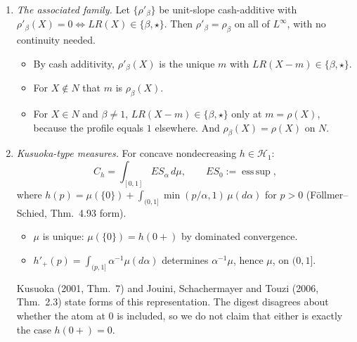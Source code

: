 \begin{proposition}[Uniqueness]
\begin{enumerate}
  \begin{itemize}
  \item If $r(p)\neq1$: $g(p)=\dfrac{\varphi_B(t)-1}{t\,(r(p)-\varphi_B(t))}$ and $h=r\,g$. The denominator is nonzero, because $\varphi_B=r$ would force $r=1$.
  \item If $r(p)=1$: $g(p)=\dfrac{h(q_0)-L\,g(q_0)}{L-1}$, where $L=LR_0(\mathbf 1_B+\mathbf 1_D)$ with $D$ nested and $r(q_0)\neq1$. Here $L\ne1$, since otherwise $h(q_0)=g(q_0)$.
  \end{itemize}
  Uniqueness also holds among signed pairs with $C_{g'}>0$ on $\mathcal X$:
  \begin{itemize}
  \item by the Half-line Lemma, $C_{h'}=\rho$ and $C_{g'}=\Pi$ off $N_0$;
  \item $N_0$ is fixed by $LR_0$ and has dense complement, by the Sweep Lemma since $h\ne g$;
  \item by continuity, $C_{h'}=\bar\rho$ and $C_{g'}=\bar\Pi$ on $\mathcal X$.
  \end{itemize}
  For the actuarial pair $h=\mathrm{id}$ one gets $g(p)=p/LR_0(\mathbf 1_B)$. In general $g(p)=h(p)/LR_0(\mathbf 1_B)$, which presupposes knowledge of $h$.
\item \emph{The associated family.} Let $\{\rho'_\beta\}$ be unit-slope cash-additive with $\rho'_\beta(X)=0\iff LR(X)\in\{\beta,\star\}$. Then $\rho'_\beta=\rho_\beta$ on all of $L^\infty$, with no continuity needed.
  \begin{itemize}
  \item By cash additivity, $\rho'_\beta(X)$ is the unique $m$ with $LR(X-m)\in\{\beta,\star\}$.
  \item For $X\notin N$ that $m$ is $\rho_\beta(X)$.
  \item For $X\in N$ and $\beta\ne1$, $LR(X-m)\in\{\beta,\star\}$ only at $m=\rho(X)$, because the profile equals $1$ elsewhere. And $\rho_\beta(X)=\rho(X)$ on $N$.
  \end{itemize}
\item \emph{Kusuoka-type measures.} For concave nondecreasing $h\in\mathcal H_1$:
  \[
  C_h=\int_{[0,1]}ES_\alpha\,d\mu,\qquad ES_0:=\operatorname{ess\,sup},
  \]
  where $h(p)=\mu(\{0\})+\int_{(0,1]}\min(p/\alpha,1)\,\mu(d\alpha)$ for $p>0$ (F\"ollmer--Schied, Thm.~4.93 form).
  \begin{itemize}
  \item $\mu$ is unique: $\mu(\{0\})=h(0+)$ by dominated convergence.
  \item $h'_+(p)=\int_{(p,1]}\alpha^{-1}\mu(d\alpha)$ determines $\alpha^{-1}\mu$, hence $\mu$, on $(0,1]$.
  \end{itemize}
  Kusuoka (2001, Thm.~7) and Jouini, Schachermayer and Touzi (2006, Thm.~2.3) state forms of this representation. The digest disagrees about whether the atom at $0$ is included, so we do not claim that either is exactly the case $h(0+)=0$.
\end{enumerate}
\end{proposition}

